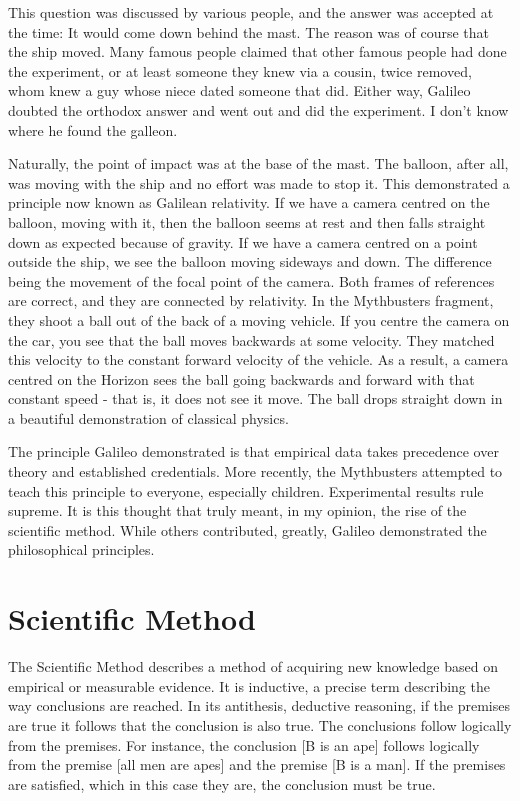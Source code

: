 \begin{multicols}{2}
This question was discussed by various people, and the answer was accepted at the time: It would come down behind the mast. The reason was of
course that the ship moved. Many famous people claimed that other famous people had done the experiment, or at least someone they knew via a
cousin, 	twice removed, whom knew a guy whose niece dated someone that did. Either way, Galileo doubted the orthodox answer and went out and
did the experiment. I don't know where he found the galleon. 


Naturally, the point of impact was at the base of the mast. The balloon, after all, was moving with the ship and no effort was made to stop it.
This demonstrated a principle now known as Galilean relativity. If we have a camera centred on the balloon, moving with it, then the balloon seems
at rest and then falls straight down as expected because of gravity. If we have a camera centred on a point outside the ship, we see the balloon
moving sideways and down. The difference being the movement of the focal point of the camera. Both frames of references are correct, and they are
connected by relativity. In the Mythbusters fragment, they shoot a ball out of the back of a moving vehicle. If you centre the camera on the car, 
you see that the ball moves backwards at some velocity. They matched this velocity to the constant forward velocity of the vehicle. As a result, 
a camera centred on the Horizon sees the ball going backwards and forward with that constant speed - that is, it does not see it move. The ball
drops straight down in a beautiful demonstration of classical physics.


The principle Galileo demonstrated is that empirical data takes precedence over theory and established credentials. More recently, the Mythbusters
attempted to teach this principle to everyone, especially children.
Experimental results rule supreme. It is this thought that truly meant, in my opinion, the rise of the scientific method. While others contributed, greatly, Galileo
demonstrated the philosophical principles.

\section{Scientific Method}

The Scientific Method describes a method of acquiring new knowledge based on empirical or measurable evidence. It is inductive, a precise term
describing the way conclusions are reached. In its antithesis, deductive reasoning, if the premises are true it follows that the conclusion is also true. The
conclusions follow logically from the premises. For instance, the conclusion [B is an ape] follows logically from the premise [all men are apes]
and the premise [B is a man]. If the premises are satisfied, which in this case they are, the conclusion must be true.



\end{multicols}
